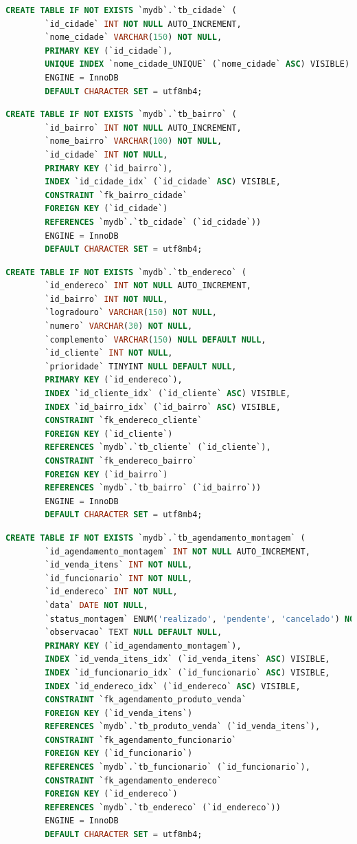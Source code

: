 \documentclass[
12pt,
a4paper,
semrecuonosumario,
sumario = abnt-6027-2012]{report}
\begin{document}
    \begin{lstlisting}[language=SQL,caption={DDL -- Tabela \texttt{tb\_cidade}}]
		CREATE TABLE IF NOT EXISTS `mydb`.`tb_cidade` (
		`id_cidade` INT NOT NULL AUTO_INCREMENT,
		`nome_cidade` VARCHAR(150) NOT NULL,
		PRIMARY KEY (`id_cidade`),
		UNIQUE INDEX `nome_cidade_UNIQUE` (`nome_cidade` ASC) VISIBLE)
		ENGINE = InnoDB
		DEFAULT CHARACTER SET = utf8mb4;
    \end{lstlisting}
    \begin{lstlisting}[language=SQL,caption={DDL -- Tabela \texttt{tb\_bairro}}]
		CREATE TABLE IF NOT EXISTS `mydb`.`tb_bairro` (
		`id_bairro` INT NOT NULL AUTO_INCREMENT,
		`nome_bairro` VARCHAR(100) NOT NULL,
		`id_cidade` INT NOT NULL,
		PRIMARY KEY (`id_bairro`),
		INDEX `id_cidade_idx` (`id_cidade` ASC) VISIBLE,
		CONSTRAINT `fk_bairro_cidade`
		FOREIGN KEY (`id_cidade`)
		REFERENCES `mydb`.`tb_cidade` (`id_cidade`))
		ENGINE = InnoDB
		DEFAULT CHARACTER SET = utf8mb4;
    \end{lstlisting}
    \begin{lstlisting}[language=SQL,caption={DDL -- Tabela \texttt{tb\_endereco}}]
    	CREATE TABLE IF NOT EXISTS `mydb`.`tb_endereco` (
    	`id_endereco` INT NOT NULL AUTO_INCREMENT,
    	`id_bairro` INT NOT NULL,
    	`logradouro` VARCHAR(150) NOT NULL,
    	`numero` VARCHAR(30) NOT NULL,
    	`complemento` VARCHAR(150) NULL DEFAULT NULL,
    	`id_cliente` INT NOT NULL,
    	`prioridade` TINYINT NULL DEFAULT NULL,
    	PRIMARY KEY (`id_endereco`),
    	INDEX `id_cliente_idx` (`id_cliente` ASC) VISIBLE,
    	INDEX `id_bairro_idx` (`id_bairro` ASC) VISIBLE,
    	CONSTRAINT `fk_endereco_cliente`
    	FOREIGN KEY (`id_cliente`)
    	REFERENCES `mydb`.`tb_cliente` (`id_cliente`),
    	CONSTRAINT `fk_endereco_bairro`
    	FOREIGN KEY (`id_bairro`)
    	REFERENCES `mydb`.`tb_bairro` (`id_bairro`))
    	ENGINE = InnoDB
    	DEFAULT CHARACTER SET = utf8mb4;
    \end{lstlisting}
    \begin{lstlisting}[language=SQL,caption={DDL -- Tabela \texttt{tb\_agendamento\_montagem}}]
		CREATE TABLE IF NOT EXISTS `mydb`.`tb_agendamento_montagem` (
		`id_agendamento_montagem` INT NOT NULL AUTO_INCREMENT,
		`id_venda_itens` INT NOT NULL,
		`id_funcionario` INT NOT NULL,
		`id_endereco` INT NOT NULL,
		`data` DATE NOT NULL,
		`status_montagem` ENUM('realizado', 'pendente', 'cancelado') NOT NULL,
		`observacao` TEXT NULL DEFAULT NULL,
		PRIMARY KEY (`id_agendamento_montagem`),
		INDEX `id_venda_itens_idx` (`id_venda_itens` ASC) VISIBLE,
		INDEX `id_funcionario_idx` (`id_funcionario` ASC) VISIBLE,
		INDEX `id_endereco_idx` (`id_endereco` ASC) VISIBLE,
		CONSTRAINT `fk_agendamento_produto_venda`
		FOREIGN KEY (`id_venda_itens`)
		REFERENCES `mydb`.`tb_produto_venda` (`id_venda_itens`),
		CONSTRAINT `fk_agendamento_funcionario`
		FOREIGN KEY (`id_funcionario`)
		REFERENCES `mydb`.`tb_funcionario` (`id_funcionario`),
		CONSTRAINT `fk_agendamento_endereco`
		FOREIGN KEY (`id_endereco`)
		REFERENCES `mydb`.`tb_endereco` (`id_endereco`))
		ENGINE = InnoDB
		DEFAULT CHARACTER SET = utf8mb4;
    \end{lstlisting}
\end{document}
